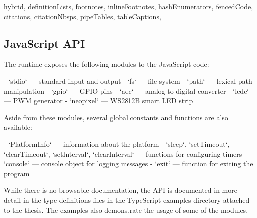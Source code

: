 \begin{markdown*}{%
  hybrid,
  definitionLists,
  footnotes,
  inlineFootnotes,
  hashEnumerators,
  fencedCode,
  citations,
  citationNbsps,
  pipeTables,
  tableCaptions,
}
\subsection{JavaScript API}

The runtime exposes the following modules to the JavaScript code:

  - `stdio` --- standard input and output
  - `fs` --- file system
  - `path` --- lexical path manipulation
  - `gpio` --- GPIO pins
  - `adc` --- analog-to-digital converter
  - `ledc` --- PWM generator
  - `neopixel` --- WS2812B smart LED strip

\noindent
Aside from these modules, several global constants and functions are also available:

  - `PlatformInfo` --- information about the platform
  - `sleep`, `setTimeout`, `clearTimeout`, `setInterval`, `clearInterval` --- functions for configuring timers
  - `console` --- console object for logging messages
  - `exit` --- function for exiting the program

\noindent
While there is no browsable documentation, the API is documented in more detail in the type definitions files in the TypeScript examples directory attached to the thesis. The examples also demonstrate the usage of some of the modules.

\end{markdown*}
